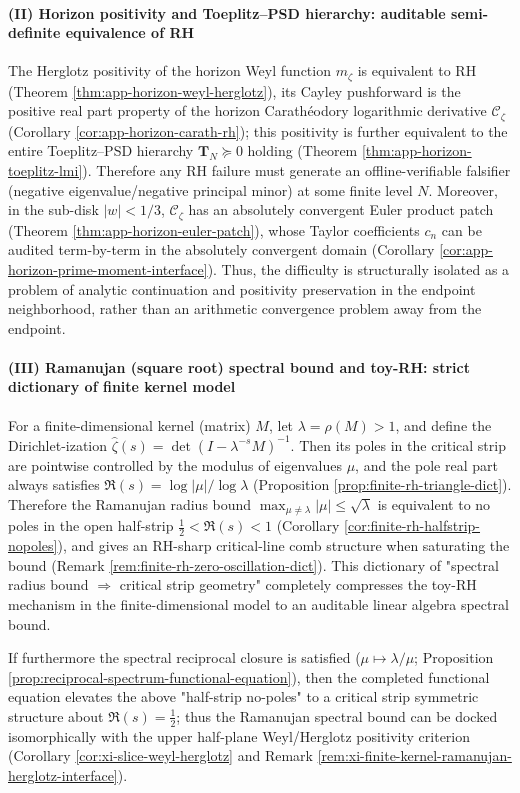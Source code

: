 \paragraph{(II) Horizon positivity and Toeplitz--PSD hierarchy: auditable semi-definite equivalence of RH}
The Herglotz positivity of the horizon Weyl function \(m_{\zeta}\) is equivalent to RH (Theorem \ref{thm:app-horizon-weyl-herglotz}), its Cayley pushforward is the positive real part property of the horizon Carath\'eodory logarithmic derivative \(\mathscr{C}_{\zeta}\) (Corollary \ref{cor:app-horizon-carath-rh}); this positivity is further equivalent to the entire Toeplitz--PSD hierarchy \(\mathbf{T}_N\succeq 0\) holding (Theorem \ref{thm:app-horizon-toeplitz-lmi}).
Therefore any RH failure must generate an offline-verifiable falsifier (negative eigenvalue/negative principal minor) at some finite level \(N\).
Moreover, in the sub-disk \(|w|<1/3\), \(\mathscr{C}_{\zeta}\) has an absolutely convergent Euler product patch (Theorem \ref{thm:app-horizon-euler-patch}), whose Taylor coefficients \(c_n\) can be audited term-by-term in the absolutely convergent domain (Corollary \ref{cor:app-horizon-prime-moment-interface}).
Thus, the difficulty is structurally isolated as a problem of analytic continuation and positivity preservation in the endpoint neighborhood, rather than an arithmetic convergence problem away from the endpoint.

\paragraph{(III) Ramanujan (square root) spectral bound and toy-RH: strict dictionary of finite kernel model}
For a finite-dimensional kernel (matrix) \(M\), let \(\lambda=\rho(M)>1\), and define the Dirichlet-ization \(\widehat{\zeta}(s)=\det(I-\lambda^{-s}M)^{-1}\).
Then its poles in the critical strip are pointwise controlled by the modulus of eigenvalues \(\mu\), and the pole real part always satisfies
\(
\Re(s)=\log|\mu|/\log\lambda
\)
(Proposition \ref{prop:finite-rh-triangle-dict}).
Therefore the Ramanujan radius bound
\(
\max_{\mu\neq\lambda}|\mu|\le\sqrt{\lambda}
\)
is equivalent to no poles in the open half-strip \(\tfrac12<\Re(s)<1\) (Corollary \ref{cor:finite-rh-halfstrip-nopoles}), and gives an RH-sharp critical-line comb structure when saturating the bound (Remark \ref{rem:finite-rh-zero-oscillation-dict}).
This dictionary of "spectral radius bound \(\Rightarrow\) critical strip geometry" completely compresses the toy-RH mechanism in the finite-dimensional model to an auditable linear algebra spectral bound.
\par
If furthermore the spectral reciprocal closure is satisfied (\(\mu\mapsto \lambda/\mu\); Proposition \ref{prop:reciprocal-spectrum-functional-equation}), then the completed functional equation elevates the above "half-strip no-poles" to a critical strip symmetric structure about \(\Re(s)=\tfrac12\);
thus the Ramanujan spectral bound can be docked isomorphically with the upper half-plane Weyl/Herglotz positivity criterion (Corollary \ref{cor:xi-slice-weyl-herglotz} and Remark \ref{rem:xi-finite-kernel-ramanujan-herglotz-interface}).

